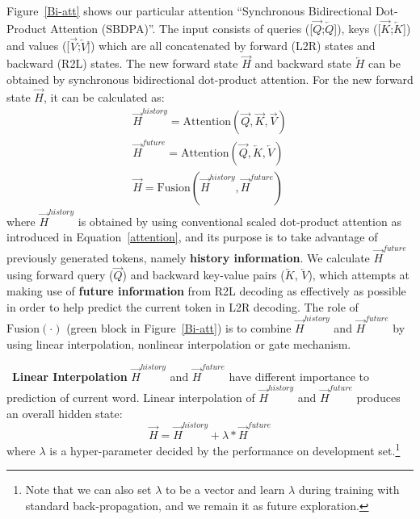 \documentclass[11pt,a4paper]{article}
\begin{document}
\begin{CJK*}{UTF8}{gbsn}
Figure~\ref{Bi-att} shows our particular attention ``Synchronous Bidirectional Dot-Product Attention (SBDPA)''.
The input consists of queries ([$\overrightarrow{Q}$;$\overleftarrow{Q}$]), keys ([$\overrightarrow{K}$;$\overleftarrow{K}$]) and values ([$\overrightarrow{V}$;$\overleftarrow{V}$])
which are all concatenated by forward (L2R) states and backward (R2L) states.
The new forward state $\overrightarrow{H}$ and backward state $\overleftarrow{H}$ can be obtained by synchronous bidirectional dot-product attention. For the new forward state $\overrightarrow{H}$, it can be calculated as:
\begin{equation}\label{F-SBA}
\begin{aligned}
  \overrightarrow{H}^{history} = \mbox{Attention}(\overrightarrow{Q}, \overrightarrow{K}, \overrightarrow{V}) \\
  \overrightarrow{H}^{future} = \mbox{Attention}(\overrightarrow{Q}, \overleftarrow{K}, \overleftarrow{V}) \\
  \overrightarrow{H} = \mbox{Fusion}(\overrightarrow{H}^{history}, \overrightarrow{H}^{future})
\end{aligned}
\end{equation}
where $\overrightarrow{H}^{history}$ is obtained by using conventional scaled dot-product attention as introduced in Equation~\ref{attention}, and its purpose is to take advantage of previously generated tokens, namely {\bf history information}.
We calculate $\overrightarrow{H}^{future}$ using forward query ($\overrightarrow{Q}$) and backward key-value pairs ($\overleftarrow{K}$, $\overleftarrow{V}$), which attempts at making use of {\bf future information} from R2L decoding as effectively as possible in order to help predict the current token in L2R decoding.
The role of $\mbox{Fusion}(\cdot)$ (green block in Figure~\ref{Bi-att}) is to combine $\overrightarrow{H}^{history}$ and $\overrightarrow{H}^{future}$ by using linear interpolation, nonlinear interpolation or gate mechanism.

~\textbf{Linear Interpolation} $\overrightarrow{H}^{history}$ and $\overrightarrow{H}^{future}$ have different importance to prediction of current word. Linear interpolation of $\overrightarrow{H}^{history}$ and $\overrightarrow{H}^{future}$ produces an overall hidden state:
\begin{equation} \label{Linear}
  \overrightarrow{H} = \overrightarrow{H}^{history} + \lambda * \overrightarrow{H}^{future}
\end{equation}
where $\lambda$ is a hyper-parameter decided by the performance on development set.{\footnote[3]{Note that we can also set $\lambda$ to be a vector and learn $\lambda$ during training with standard back-propagation, and we remain it as future exploration.}}


\end{CJK*}
\end{document}
